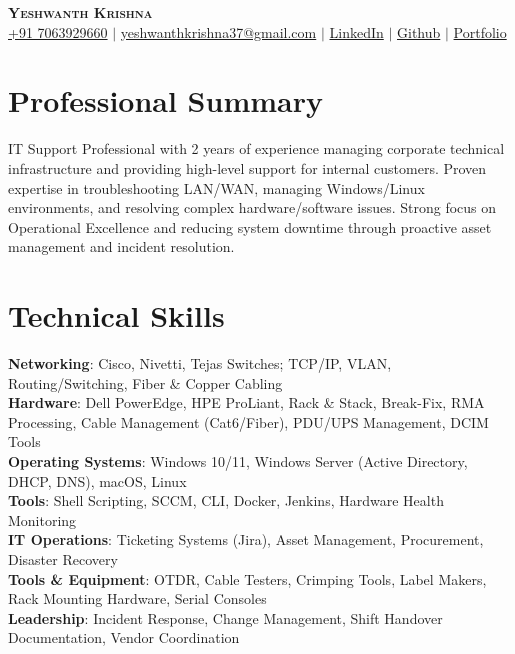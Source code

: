 \documentclass[letterpaper,11pt]{article}
\begin{document}
\begin{center}
    \textbf{\Huge \scshape Yeshwanth Krishna} \\ \vspace{1pt}
    \href{tel:917063929660}{\small +91 7063929660} $|$ \href{mailto:yeshwanthkrishna37@gmail.com}{\small{yeshwanthkrishna37@gmail.com}} $|$ 
    \href{https://linkedin.com/in/yeshwanth-kr}{\small{LinkedIn}} $|$
    \href{https://github.com/Yeshwanth-kr}{\small{Github}} $|$
    \href{https://yeshwanth.online}{\small{Portfolio}}
\end{center}

\section{Professional Summary}
 \small{
  IT Support Professional with 2 years of experience managing corporate technical infrastructure and providing high-level support for internal customers. Proven expertise in troubleshooting LAN/WAN, managing Windows/Linux environments, and resolving complex hardware/software issues. Strong focus on Operational Excellence and reducing system downtime through proactive asset management and incident resolution.
 }

\section{Technical Skills}
 \begin{itemize}[leftmargin=0.15in, label={}]
    \small{\item{
     \textbf{Networking}{: Cisco, Nivetti, Tejas Switches; TCP/IP, VLAN, Routing/Switching, Fiber \& Copper Cabling} \\
     \textbf{Hardware}{: Dell PowerEdge, HPE ProLiant, Rack \& Stack, Break-Fix, RMA Processing, Cable Management (Cat6/Fiber), PDU/UPS Management, DCIM Tools} \\
     \textbf{Operating Systems}{: Windows 10/11, Windows Server (Active Directory, DHCP, DNS), macOS, Linux} \\
     \textbf{Tools}{: Shell Scripting, SCCM, CLI, Docker, Jenkins, Hardware Health Monitoring} \\
     \textbf{IT Operations}{: Ticketing Systems (Jira), Asset Management, Procurement, Disaster Recovery} \\
     \textbf{Tools \& Equipment}{: OTDR, Cable Testers, Crimping Tools, Label Makers, Rack Mounting Hardware, Serial Consoles} \\
     \textbf{Leadership}{: Incident Response, Change Management, Shift Handover Documentation, Vendor Coordination} 
    }}
 \end{itemize}
\end{document}
